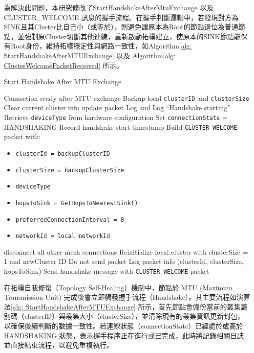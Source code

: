 \begin{ZhChapter}
為解決此問題，本研究修改了StartHandshakeAfterMtuExchange 以及 CLUSTER\_WELCOME 訊息的握手流程。在握手判斷邏輯中，若發現對方為SINK且其Cluster比自己小（或等於），則避免讓原本為Root的節點退位為普通節點，並強制原Cluster切斷其他連線，重新啟動拓樸建立，使原本的SINK節點能保有Root身份，維持拓樸穩定性與網路一致性，如Algorithm\ref{alg: StartHandshakeAfterMTUExchange} 以及 Algorithm\ref{alg: ClusterWelcomePacketReceived} 所示。

\begin{algorithm}[H]
\caption{Start Handshake After MTU Exchange}
\label{alg: StartHandshakeAfterMTUExchange}
\begin{algorithmic}[1]
\Require Connection ready after MTU exchange
\State Backup local \texttt{clusterID} and \texttt{clusterSize}
\State Clear current cluster info update packet
    \State Log and \Return {}
\EndIf
\State Log ``Handshake starting''
\State Retrieve \texttt{deviceType} from hardware configuration
\State Set \texttt{connectionState} = HANDSHAKING
\State Record handshake start timestamp
\State Build \texttt{CLUSTER\_WELCOME} packet with:
    \begin{itemize}
        \item \texttt{clusterId = backupClusterID}
        \item \texttt{clusterSize = backupClusterSize}
        \item \texttt{deviceType}
        \item \texttt{hopsToSink = GetHopsToNearestSink()}
        \item \texttt{preferredConnectionInterval = 0}
        \item \texttt{networkId = local networkId}
    \end{itemize}
    \State disconnect all other mesh connections
    \State Reinitialize local cluster with clusterSize = 1 and newCluster ID
    \State Do not send packet
\Else
    \State Log packet info (clusterId, clusterSize, hopsToSink)
    \State Send handshake message with \texttt{CLUSTER\_WELCOME} packet
\EndIf
\end{algorithmic}
\end{algorithm}

在拓樸自我修復（Topology Self-Healing）機制中，節點於 MTU (Maximum Transmission Unit) 完成後會立即觸發握手流程（Handshake）。其主要流程如演算法\ref{alg: StartHandshakeAfterMTUExchange} 所示，首先節點會備份當前的叢集識別碼（clusterID）與叢集大小（clusterSize），並清除現有的叢集資訊更新封包，以確保後續判斷的數據一致性。若連線狀態（connectionState）已經處於或高於 HANDSHAKING 狀態，表示握手程序正在進行或已完成，此時將記錄相關日誌並直接結束流程，以避免重複執行。


\end{ZhChapter}
